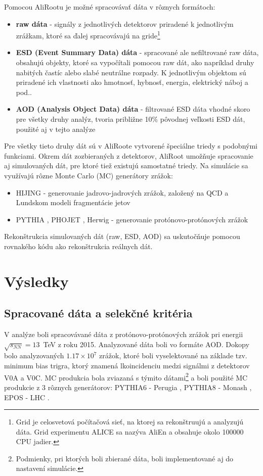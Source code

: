 \documentclass[thesismargins, thesislinespacing]{rnthesis}
\begin{document}
Pomocou AliRootu je možné spracovávať dáta v rôznych formátoch:
\begin{itemize}
	\item \textbf {raw dáta} - signály z jednotlivých detektorov priradené k jednotlivým zrážkam, ktoré sa ďalej spracovávajú na gride\footnote{Grid je celosvetová počítačová sieť, na ktorej sa rekonštruujú a analyzujú dáta. Grid experimentu ALICE sa nazýva AliEn a obsahuje okolo 100000 CPU jadier.} 
	\item \textbf {ESD (Event Summary Data) dáta} - spracované ale nefiltrované raw dáta, obsahujú objekty, ktoré sa vypočítali pomocou raw dát, ako napríklad druhy nabitých častíc alebo slabé neutrálne rozpady. K jednotlivým objektom sú priradené ich vlastnosti ako hmotnosť, hybnosť, energia, elektrický náboj a pod..
	\item \textbf {AOD (Analysis Object Data) dáta} - filtrované ESD dáta vhodné skoro pre všetky druhy analýz, tvoria približne 10\% pôvodnej veľkosti ESD dát, použité aj v tejto analýze
\end{itemize}

Pre všetky tieto druhy dát sú v AliRoote vytvorené špeciálne triedy s podobnými funkciami. Okrem dát zozbieraných z detektorov, AliRoot umožňuje spracovanie aj simulovaných dát, pre ktoré tiež existujú samostatné triedy. Na simulácie sa využívajú rôzne Monte Carlo (MC) generátory zrážok:
\begin{itemize}
	\item HIJING \cite{hijing} - generovanie jadrovo-jadrových zrážok, založený na QCD a Lundskom modeli fragmentácie jetov
	\item PYTHIA \cite{pythia}, PHOJET \cite{phojet}, Herwig \cite{herwig} - generovanie protónovo-protónových zrážok
\end{itemize}

Rekonštrukcia simulovaných dát (raw, ESD, AOD) sa uskutočňuje pomocou rovnakého kódu ako rekonštrukcia reálnych dát.

\chapter{Výsledky}

\section{Spracované dáta a selekčné kritéria}
V analýze boli spracovávané dáta z protónovo-protónových zrážok pri energii $\sqrt{s_{NN}}=13$~TeV z roku 2015. Analyzované dáta boli vo formáte AOD. Dokopy bolo analyzovaných $1.17\times10^7$ zrážok, ktoré boli vyselektované na základe tzv. minimum bias trigra, ktorý znamená lkoincidenciu medzi signálmi z detektorov V0A a V0C.
MC produkcia bola zviazaná s týmito dátami\footnote{Podmienky, pri ktorých boli zbierané dáta, boli implementované aj do nastavení simulácie. } a boli použité MC produkcie z 3 rôznych generátorov: PYTHIA6 - Perugia \cite{perugia} , PYTHIA8 - Monash \cite{monash}, EPOS - LHC \cite{epos}. 
\end{document}
